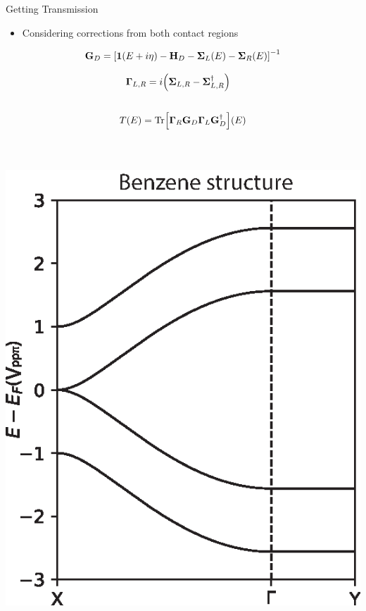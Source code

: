 \documentclass[hyperref={colorlinks=true,urlcolor=blue,linkcolor=.},aspectratio=1610,mathserif]{beamer}
\newcommand{\im}[3]{\inputminted[linenos=true, python3=true, firstline=#2, lastline=#3]{python}{#1}}
\begin{document}
\begin{frame}{Getting Transmission}
	\centering
	\begin{overprint}
		\begin{itemize}
		    \item Considering corrections from both contact regions
		\end{itemize}
		\begin{align*}
			\vb{G}_D  = \bqty{\vb{1}\pqty{E+i\eta}-\vb{H}_D - \vb{\Sigma}_L(E)-\vb{\Sigma}_R(E)}^{-1}
		\end{align*}
		
		\begin{align*}
		    \vb{\Gamma}_{L,R} & = i\pqty{\vb{\Sigma}_{L,R} - \vb{\Sigma}_{L,R}^{\dagger}}
		\end{align*}
		\im{Listings/Functions.py}{225}{228}
		\begin{align*}
			T(E) = \mathrm{Tr}\bqty{\vb{\Gamma}_R\vb{G}_D\vb{\Gamma}_L\vb{G}_D^{\dagger}}(E)
		\end{align*}
		\begin{columns}[c]
			\im{Listings/Functions.py}{240}{243}
		\end{columns}
		\vspace{-.5cm}
		\begin{columns}[c]
			\includegraphics[width=.75\textwidth]{Figures/Beta1.eps}

\end{columns}
\end{overprint}
\end{frame}
\end{document}
